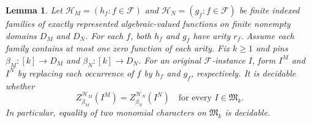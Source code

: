 \documentclass[11pt,letterpaper,onecolumn]{article}
\theoremstyle{plain}
\newtheorem{lemma}[lemma]{Lemma}
\theoremstyle{definition}
\theoremstyle{remark}
\newcommand{\cF}{\mathcal F}
\newcommand{\InstMonoid}[1]{\mathfrak M_{#1}}
\begin{document}
\begin{lemma}
\label{lem:character-comparison}
Let $\mathcal H_M=(h_f:f\in\cF)$ and $\mathcal H_N=(g_f:f\in\cF)$ be
finite indexed families of exactly represented algebraic-valued functions
on finite nonempty domains $D_M$ and $D_N$.  For each $f$, both $h_f$ and
$g_f$ have arity $r_f$.  Assume each family contains at most one zero
function of each arity.  Fix $k\ge1$ and pins $\beta_M:[k]\to D_M$ and
$\beta_N:[k]\to D_N$.
For an original $\cF$-instance $I$, form $I^M$ and $I^N$ by replacing
each occurrence of $f$ by $h_f$ and $g_f$, respectively.  It is decidable
whether
\[
 Z_{\beta_M}^{\mathcal H_M}(I^M)=Z_{\beta_N}^{\mathcal H_N}(I^N)
 \quad\text{for every }I\in\InstMonoid{k}.
\]
In particular, equality of two monomial characters on $\InstMonoid{k}$
is decidable.
\end{lemma}
\end{document}
